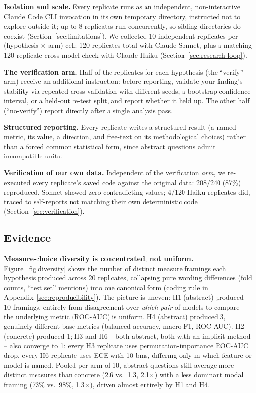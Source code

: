 \documentclass{article}
\begin{document}
\textbf{Isolation and scale.} Every replicate runs as an independent, non-interactive
Claude Code CLI invocation in its own temporary directory, instructed not to explore
outside it; up to 8 replicates run concurrently, so sibling directories do coexist
(Section~\ref{sec:limitations}). We collected 10 independent replicates per (hypothesis
$\times$ arm) cell: 120 replicates total with Claude Sonnet, plus a matching 120-replicate
cross-model check with Claude Haiku (Section~\ref{sec:research-loop}).

\textbf{The verification arm.} Half of the replicates for each hypothesis (the ``verify''
arm) receive an additional instruction: before reporting, validate your finding's
stability via repeated cross-validation with different seeds, a bootstrap confidence
interval, or a held-out re-test split, and report whether it held up. The other half
(``no-verify'') report directly after a single analysis pass.

\textbf{Structured reporting.} Every replicate writes a structured result (a named metric,
its value, a direction, and free-text on its methodological choices) rather than a forced
common statistical form, since abstract questions admit incompatible units.

\textbf{Verification of our own data.} Independent of the verification \emph{arm}, we
re-executed every replicate's saved code against the original data: 208/240 (87\%) reproduced.
Sonnet showed zero contradicting values; 4/120 Haiku replicates did, traced to
self-reports not matching their own deterministic code (Section~\ref{sec:verification}).

\subsection{Evidence}
\label{sec:evidence}

\textbf{Measure-choice diversity is concentrated, not uniform.} Figure~\ref{fig:diversity}
shows the number of distinct measure framings each hypothesis produced across 20
replicates, collapsing pure wording differences (fold counts, ``test set'' mentions) into
one canonical form (coding rule in Appendix~\ref{sec:reproducibility}). The picture is
uneven: H1 (abstract) produced 10 framings, entirely from disagreement over \emph{which
pair} of models to compare -- the underlying metric (ROC-AUC) is uniform. H4 (abstract)
produced 3, genuinely different base metrics (balanced accuracy, macro-F1, ROC-AUC). H2
(concrete) produced 1; H3 and H6 -- both abstract, both with an implicit method -- also
converge to 1: every H3 replicate uses permutation-importance ROC-AUC drop, every H6
replicate uses ECE \citep{guo2017} with 10 bins, differing only in which feature or model is
named. Pooled per
arm of 10, abstract questions still average more distinct measures than concrete (2.6 vs.\
1.3, 2.1$\times$) with a less dominant modal framing (73\% vs.\ 98\%, 1.3$\times$), driven
almost entirely by H1 and H4.
\end{document}
